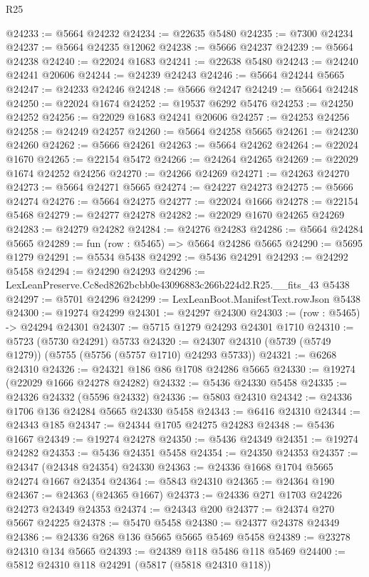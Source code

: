 \begin{lexlean}{R25}
\begin{coremodule}
@24233 := @5664 @24232
@24234 := @22635 @5480
@24235 := @7300 @24234
@24237 := @5664 @24235 @12062
@24238 := @5666 @24237
@24239 := @5664 @24238
@24240 := @22024 @1683
@24241 := @22638 @5480
@24243 := @24240 @24241 @20606
@24244 := @24239 @24243
@24246 := @5664 @24244 @5665
@24247 := @24233 @24246
@24248 := @5666 @24247
@24249 := @5664 @24248
@24250 := @22024 @1674
@24252 := @19537 @6292 @5476
@24253 := @24250 @24252
@24256 := @22029 @1683 @24241 @20606
@24257 := @24253 @24256
@24258 := @24249 @24257
@24260 := @5664 @24258 @5665
@24261 := @24230 @24260
@24262 := @5666 @24261
@24263 := @5664 @24262
@24264 := @22024 @1670
@24265 := @22154 @5472
@24266 := @24264 @24265
@24269 := @22029 @1674 @24252 @24256
@24270 := @24266 @24269
@24271 := @24263 @24270
@24273 := @5664 @24271 @5665
@24274 := @24227 @24273
@24275 := @5666 @24274
@24276 := @5664 @24275
@24277 := @22024 @1666
@24278 := @22154 @5468
@24279 := @24277 @24278
@24282 := @22029 @1670 @24265 @24269
@24283 := @24279 @24282
@24284 := @24276 @24283
@24286 := @5664 @24284 @5665
@24289 := fun (row : @5465) => @5664 @24286 @5665
@24290 := @5695 @1279
@24291 := @5534 @5438
@24292 := @5436 @24291
@24293 := @24292 @5458
@24294 := @24290 @24293
@24296 := LexLeanPreserve.Cc8ed8262bcbb0e43096883c266b224d2.R25.__fits_43 @5438
@24297 := @5701 @24296
@24299 := LexLeanBoot.ManifestText.rowJson @5438
@24300 := @19274 @24299
@24301 := @24297 @24300
@24303 := (row : @5465) -> @24294 @24301
@24307 := @5715 @1279 @24293 @24301 @1710
@24310 := @5723 (@5730 @24291) @5733
@24320 := @24307 @24310 (@5739 (@5749 @1279)) (@5755 (@5756 (@5757 @1710) @24293 @5733))
@24321 := @6268 @24310
@24326 := @24321 @186 @86 @1708 @24286 @5665
@24330 := @19274 (@22029 @1666 @24278 @24282)
@24332 := @5436 @24330 @5458
@24335 := @24326 @24332 (@5596 @24332)
@24336 := @5803 @24310
@24342 := @24336 @1706 @136 @24284 @5665 @24330 @5458
@24343 := @6416 @24310
@24344 := @24343 @185
@24347 := @24344 @1705 @24275 @24283
@24348 := @5436 @1667
@24349 := @19274 @24278
@24350 := @5436 @24349
@24351 := @19274 @24282
@24353 := @5436 @24351 @5458
@24354 := @24350 @24353
@24357 := @24347 (@24348 @24354) @24330
@24363 := @24336 @1668 @1704 @5665 @24274 @1667 @24354
@24364 := @5843 @24310
@24365 := @24364 @190
@24367 := @24363 (@24365 @1667)
@24373 := @24336 @271 @1703 @24226 @24273 @24349 @24353
@24374 := @24343 @200
@24377 := @24374 @270 @5667 @24225
@24378 := @5470 @5458
@24380 := @24377 @24378 @24349
@24386 := @24336 @268 @136 @5665 @5665 @5469 @5458
@24389 := @23278 @24310 @134 @5665
@24393 := @24389 @118 @5486 @118 @5469
@24400 := @5812 @24310 @118 @24291 (@5817 (@5818 @24310 @118))

\end{coremodule}
\end{lexlean}
